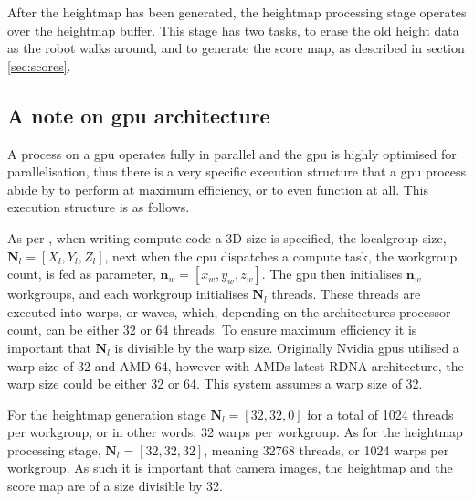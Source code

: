         After the heightmap has been generated, the heightmap processing stage operates over the heightmap buffer. This stage has two tasks, to erase the
        old height data as the robot walks around, and to generate the score map, as described in section \ref{sec:scores}.
        
        \newpage
        \subsection{A note on \ac{gpu} architecture}
            A process on a \ac{gpu} operates fully in parallel and the \ac{gpu} is highly optimised for parallelisation, thus there is a very specific
            execution structure that a \ac{gpu} process abide by to perform at maximum efficiency, or to even function at all. This execution structure is
            as follows.
            
            As per \cite{nvidia_doc}, when writing compute code a 3D size is specified, the localgroup size, \(\bm{N}_{l} = [X_l,Y_{l},Z_{l}]\), next when the \ac{cpu} dispatches
            a compute task, the workgroup count, is fed as parameter, \(\bm{n}_{w} = [x_{w},y_{w},z_{w}]\). The \ac{gpu} then initialises
            \(\bm{n}_w\) workgroups, and each workgroup initialises \(\bm{N}_l\) threads. These threads are executed into warps, or waves, which, depending on the architectures processor count,
            can be either 32 or 64 threads. To ensure maximum efficiency it is important that \(\bm{N}_l\) is divisible by the warp size.
            Originally Nvidia \ac{gpu}s utilised a warp size of 32 and AMD 64, however with AMDs latest RDNA architecture, the warp size could be either 32 or 64.
            This system assumes a warp size of 32.
            
            For the heightmap generation stage \(\bm{N}_{l} = [32,32,0]\) for a total of 1024 threads per workgroup, or in other words, 32 warps per workgroup.
            As for the heightmap processing stage, \(\bm{N}_{l} = [32,32,32]\), meaning 32768 threads, or 1024 warps per workgroup.
            As such it is important that camera images, the heightmap and the score map are of a size divisible by 32.
        
